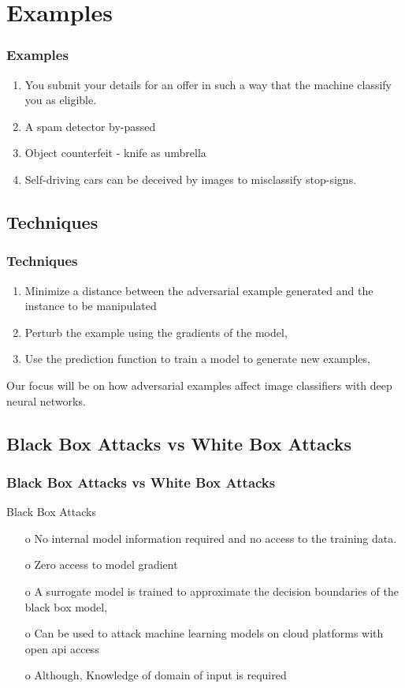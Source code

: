 \documentclass[12pt]{beamer}
\begin{document}
\section{Examples}
\begin{frame}
\frametitle{Examples}
\begin{enumerate}
	\item You submit your details for an offer in such a way that the machine classify you as eligible. \pause
	\item A spam detector by-passed \pause
	\item Object counterfeit - knife as umbrella \pause
	\item Self-driving cars can be deceived by images to misclassify stop-signs.
\end{enumerate}
\end{frame}

\subsection{Techniques}
\begin{frame}
\frametitle{Techniques}
\begin{enumerate}
	\item Minimize a distance between the adversarial example generated and the instance to be manipulated \pause
	\item Perturb the example using the gradients of the model, \pause
	\item Use the prediction function to train a model to generate new examples, \pause
\end{enumerate}
Our focus will be on how adversarial examples affect image classifiers with deep neural networks.
\end{frame}

\subsection{Black Box Attacks vs White Box Attacks}
\begin{frame}
\frametitle{Black Box Attacks vs White Box Attacks}
Black Box Attacks
\begin{itemize}
	\item[o] No internal model information required and no access to the training data. \pause
	\item[o] Zero access to model gradient \pause
	\item[o] A surrogate model is trained to approximate the decision boundaries of the black box model, \pause
	\item[o] Can be used to attack machine learning models on cloud platforms with open api access\protect\footnotemark \pause
	\item[o] Although, Knowledge of domain of input is required \pause
\end{itemize}

\end{frame}
\end{document}
